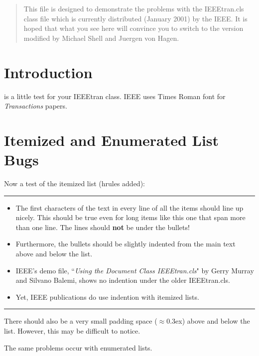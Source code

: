 \documentclass[10pt,twocolumn]{IEEEtran}
\begin{document}
\maketitle

\begin{abstract}
This file is designed to demonstrate the problems with the
IEEEtran.cls class file which is currently
distributed (January 2001) by the IEEE. 
It is hoped that what you see here will convince you to 
switch to the version modified by Michael Shell and
Juergen von Hagen.
\end{abstract}


\section{Introduction}
{} is a little test for your IEEEtran class. IEEE
uses Times Roman font for \textit{Transactions} papers.

\section{Itemized and Enumerated List Bugs}
Now a test of the itemized list (hrules added):
\vspace{0.4ex}\hrule
\begin{itemize}
\item The first characters of the text in every line of all the items
should line up nicely. This should be true even for long items
like this one that span more than one line. The lines should
{\bfseries not} be under the bullets!
\item Furthermore, the bullets should be slightly indented from the
main text above and below the list.
\item IEEE's demo file, ``\textit{Using the Document Class
IEEEtran.cls}" by Gerry Murray and Silvano Balemi, shows no
indention under the older IEEEtran.cls.
\item Yet, IEEE publications do use indention with itemized lists.
\end{itemize}
\hrule\vspace{0.4ex}
There should also be a very small padding space ($\approx$0.3ex)
above and below the list. However, this may be difficult to notice.
\par The same problems occur with enumerated lists.
\end{document}
